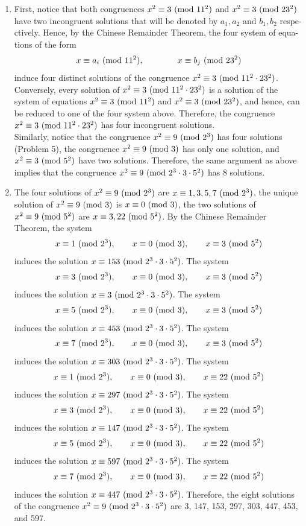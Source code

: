 \begin{solution}
    \begin{enumerate}
        \item First, notice that both congruences $x^2 \equiv 3 \ (\mathrm{mod}\ 11^2)$ and $x^2 \equiv 3 \ (\mathrm{mod}\ 23^2)$ have two incongruent solutions that will be denoted by $a_1,a_2$ and $b_1,b_2$ respe-ctively. Hence, by the Chinese Remainder Theorem, the four system of equa-tions of the form
        $$x \equiv a_i \ (\mathrm{mod}\ 11^2), \qquad \qquad x\equiv b_j \ (\mathrm{mod}\ 23^2)$$
        induce four distinct solutions of the congruence $x^2 \equiv 3 \ (\mathrm{mod}\ 11^2\cdot 23^2)$. Conversely, every solution of $x^2 \equiv 3 \ (\mathrm{mod}\ 11^2 \cdot 23^2)$ is a solution of the system of equations $x^2 \equiv 3 \ (\mathrm{mod}\ 11^2)$ and $x^2 \equiv 3 \ (\mathrm{mod}\ 23^2)$, and hence, can be reduced to one of the four system above. Therefore, the congruence $x^2 \equiv 3 \ (\mathrm{mod}\ 11^2 \cdot 23^2)$ has four incongruent solutions.\\

        Similarly, notice that the congruence $x^2 \equiv 9 \ (\mathrm{mod}\ 2^3)$ has four solutions (Problem 5), the congruence $x^2 \equiv 9 \ (\mathrm{mod}\ 3)$ has only one solution, and $x^2 \equiv 3 \ (\mathrm{mod}\ 5^2)$ have two solutions. Therefore, the same argument as above implies that the congruence $x^2 \equiv 9 \ (\mathrm{mod}\ 2^3 \cdot 3\cdot 5^2)$ has 8 solutions.
        \item The four solutions of $x^2 \equiv 9 \ (\mathrm{mod}\ 2^3)$ are $x \equiv 1,3,5,7 \ (\mathrm{mod}\ 2^3)$, the unique solution of $x^2 \equiv 9 \ (\mathrm{mod}\ 3)$ is $x \equiv 0 \ (\mathrm{mod}\ 3)$, the two solutions of $x^2 \equiv 9 \ (\mathrm{mod}\ 5^2)$ are $x \equiv 3,22 \ (\mathrm{mod}\ 5^2)$. By the Chinese Remainder Theorem, the system
        $$x \equiv 1 \ (\mathrm{mod}\ 2^3), \qquad x \equiv 0 \ (\mathrm{mod}\ 3), \qquad x \equiv 3 \ (\mathrm{mod}\ 5^2)$$
        induces the solution $x \equiv 153 \ (\mathrm{mod}\ 2^3\cdot 3\cdot 5^2)$. The system
        $$x \equiv 3 \ (\mathrm{mod}\ 2^3), \qquad x \equiv 0 \ (\mathrm{mod}\ 3), \qquad x \equiv 3 \ (\mathrm{mod}\ 5^2)$$
        induces the solution $x \equiv 3 \ (\mathrm{mod}\ 2^3\cdot 3\cdot 5^2)$. The system
        $$x \equiv 5 \ (\mathrm{mod}\ 2^3), \qquad x \equiv 0 \ (\mathrm{mod}\ 3), \qquad x \equiv 3 \ (\mathrm{mod}\ 5^2)$$
        induces the solution $x \equiv 453 \ (\mathrm{mod}\ 2^3\cdot 3\cdot 5^2)$. The system
        $$x \equiv 7 \ (\mathrm{mod}\ 2^3), \qquad x \equiv 0 \ (\mathrm{mod}\ 3), \qquad x \equiv 3 \ (\mathrm{mod}\ 5^2)$$
        induces the solution $x \equiv 303 \ (\mathrm{mod}\ 2^3\cdot 3\cdot 5^2)$. The system
        $$x \equiv 1 \ (\mathrm{mod}\ 2^3), \qquad x \equiv 0 \ (\mathrm{mod}\ 3), \qquad x \equiv 22 \ (\mathrm{mod}\ 5^2)$$
        induces the solution $x \equiv 297 \ (\mathrm{mod}\ 2^3\cdot 3\cdot 5^2)$. The system
        $$x \equiv 3 \ (\mathrm{mod}\ 2^3), \qquad x \equiv 0 \ (\mathrm{mod}\ 3), \qquad x \equiv 22 \ (\mathrm{mod}\ 5^2)$$
        induces the solution $x \equiv 147 \ (\mathrm{mod}\ 2^3\cdot 3\cdot 5^2)$. The system
        $$x \equiv 5 \ (\mathrm{mod}\ 2^3), \qquad x \equiv 0 \ (\mathrm{mod}\ 3), \qquad x \equiv 22 \ (\mathrm{mod}\ 5^2)$$
        induces the solution $x \equiv 597 \ (\mathrm{mod}\ 2^3\cdot 3\cdot 5^2)$. The system
        $$x \equiv 7 \ (\mathrm{mod}\ 2^3), \qquad x \equiv 0 \ (\mathrm{mod}\ 3), \qquad x \equiv 22 \ (\mathrm{mod}\ 5^2)$$
        induces the solution $x \equiv 447 \ (\mathrm{mod}\ 2^3\cdot 3\cdot 5^2)$. Therefore, the eight solutions of the congruence $x^2 \equiv 9 \ (\mathrm{mod}\ 2^3\cdot 3 \cdot 5^2)$ are 3, 147, 153, 297, 303, 447, 453, and 597. \\
    \end{enumerate}
\end{solution}

